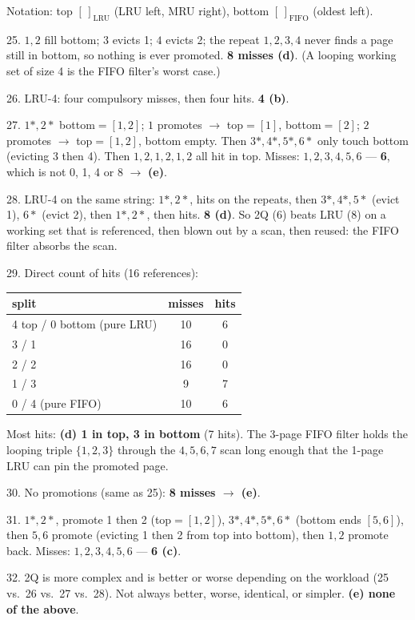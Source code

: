 \documentclass[11pt,a4paper]{article}
\newenvironment{Sol}{%
  \begin{tcolorbox}[sboxstyle, title={Solution}]%
}{%
  \end{tcolorbox}\vspace{0.35em}%
}
\begin{document}
\begin{Sol}
Notation: top $[\,]_{\mathrm{LRU}}$ (LRU left, MRU right), bottom
$[\,]_{\mathrm{FIFO}}$ (oldest left).

25. $1,2$ fill bottom; $3$ evicts 1; $4$ evicts 2; the repeat $1,2,3,4$
never finds a page still in bottom, so nothing is ever promoted.
\textbf{8 misses (d)}. (A looping working set of size 4 is the FIFO
filter's worst case.)

26. LRU-4: four compulsory misses, then four hits. \textbf{4 (b)}.

27. $1*,2*$ bottom$=[1,2]$; $1$ promotes $\to$ top$=[1]$, bottom$=[2]$;
$2$ promotes $\to$ top$=[1,2]$, bottom empty. Then $3*,4*,5*,6*$ only
touch bottom (evicting 3 then 4). Then $1,2,1,2,1,2$ all hit in top.
Misses: $1,2,3,4,5,6$ --- \textbf{6}, which is not 0, 1, 4 or 8
$\to$ \textbf{(e)}.

28. LRU-4 on the same string: $1*,2*$, hits on the repeats, then
$3*,4*,5*$ (evict 1), $6*$ (evict 2), then $1*,2*$, then hits.
\textbf{8 (d)}. So 2Q (6) beats LRU (8) on a working set that is
referenced, then blown out by a scan, then reused: the FIFO filter
absorbs the scan.

29. Direct count of hits (16 references):
\begin{center}
\begin{tabular}{lcc}
\hline
split & misses & hits \\
\hline
4 top / 0 bottom (pure LRU) & 10 & 6 \\
3 / 1 & 16 & 0 \\
2 / 2 & 16 & 0 \\
1 / 3 &  9 & 7 \\
0 / 4 (pure FIFO) & 10 & 6 \\
\hline
\end{tabular}
\end{center}
Most hits: \textbf{(d) 1 in top, 3 in bottom} (7 hits). The 3-page FIFO
filter holds the looping triple $\{1,2,3\}$ through the $4,5,6,7$ scan
long enough that the 1-page LRU can pin the promoted page.

30. No promotions (same as 25): \textbf{8 misses $\to$ (e)}.

31. $1*,2*$, promote 1 then 2 (top$=[1,2]$), $3*,4*,5*,6*$ (bottom
ends $[5,6]$), then $5,6$ promote (evicting 1 then 2 from top into
bottom), then $1,2$ promote back. Misses: $1,2,3,4,5,6$ ---
\textbf{6 (c)}.

32. 2Q is more complex and is better or worse depending on the
workload (25 vs.\ 26 vs.\ 27 vs.\ 28). Not always better, worse,
identical, or simpler. \textbf{(e) none of the above}.
\end{Sol}
\end{document}
